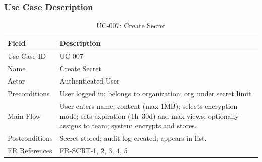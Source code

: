 \documentclass[12pt,a4paper]{article}
\begin{document}
\subsubsection{Use Case Description}

\begin{table}[H]
  \centering
  \small
  \caption{UC-007: Create Secret}
  \begin{tabular}{@{}p{2.4cm}>{\raggedright\arraybackslash}p{10.2cm}@{}}
    \toprule
    \textbf{Field} & \textbf{Description}                                                                                                                                           \\
    \midrule
    Use Case ID    & UC-007                                                                                                                                                         \\
    \hline
    Name           & Create Secret                                                                                                                                                  \\
    \hline
    Actor          & Authenticated User                                                                                                                                             \\
    \hline
    Preconditions  & User logged in; belongs to organization; org under secret limit                                                                                                \\
    \hline
    Main Flow      & User enters name, content (max 1MB); selects encryption mode; sets expiration (1h--30d) and max views; optionally assigns to team; system encrypts and stores. \\
    \hline
    Postconditions & Secret stored; audit log created; appears in list.                                                                                                             \\
    \hline
    FR References  & FR-SCRT-1, 2, 3, 4, 5                                                                                                                                          \\
    \bottomrule
  \end{tabular}
\end{table}
\end{document}
